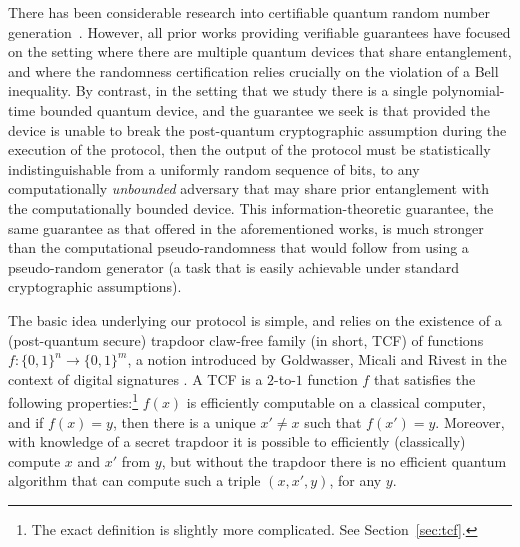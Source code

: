 \documentclass[11pt]{article}
\theoremstyle{remark}
\theoremstyle{definition}
\begin{document}
There has been considerable research into certifiable quantum random number generation~\cite{Colbeck09,Pironio,FGS11,PM11,VV12,miller2016robust,bierhorst2018experimentally}. However, all prior works providing verifiable guarantees have focused on the setting where there are multiple quantum devices
that share entanglement, and where the randomness certification relies crucially on the violation of a Bell inequality. By contrast, in the setting that we study there is a single polynomial-time bounded quantum device, and the guarantee we seek is that provided the device is unable to break the post-quantum cryptographic assumption during the execution of the protocol, then the output 
of the protocol must be statistically indistinguishable from a uniformly random sequence of bits, to any computationally \emph{unbounded} adversary that may share prior entanglement with the computationally bounded device. This information-theoretic guarantee, the same guarantee as that offered in the aforementioned works, is much stronger than the computational pseudo-randomness that would follow from using a pseudo-random generator (a task that is easily achievable under standard cryptographic assumptions). %

The basic idea underlying our protocol is simple, and relies on the existence of a (post-quantum secure) trapdoor claw-free family (in short, TCF) of functions $f:\{0,1\}^n \rightarrow \{0,1\}^m$, a notion introduced by Goldwasser, Micali and Rivest in the context of digital signatures \cite{GoldwasserMR84}.
A TCF is a $2$-to-$1$ function $f$ that satisfies the following properties:\footnote{The exact definition is slightly more complicated. See Section~\ref{sec:tcf}.} $f(x)$ is efficiently computable on a classical computer, and if $f(x) = y$, then there is a unique 
$x' \neq x$ such that $ f(x') = y$. Moreover, with knowledge of a secret trapdoor  it is possible to efficiently (classically) compute $x$ and $x'$ from $y$, but without the trapdoor there is no efficient 
quantum algorithm that can compute such a triple $(x, x', y)$, for any $y$.
 
\end{document}
